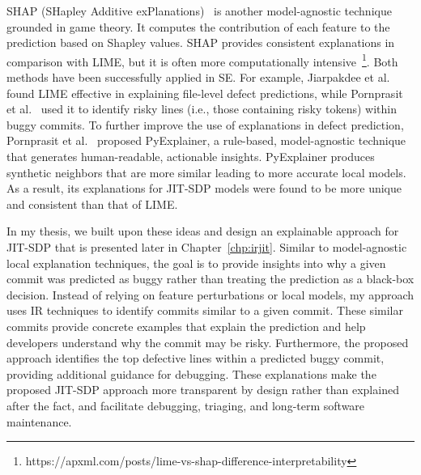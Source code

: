 \documentclass[\main/thesis.tex]{subfiles}
\begin{document}
SHAP (SHapley Additive exPlanations)~\cite{lundberg2017unified} is another model-agnostic technique grounded in game theory. It computes the contribution of each feature to the prediction based on Shapley values. SHAP provides consistent explanations in comparison with LIME, but it is often more computationally intensive~\footnote{https://apxml.com/posts/lime-vs-shap-difference-interpretability}.
Both methods have been successfully applied in SE. For example, Jiarpakdee et al.~\cite{jiarpakdee2021practitioners} found LIME effective in explaining file-level defect predictions, while Pornprasit et al.~\cite{pornprasit2021jitline} used it to identify risky lines (i.e., those containing risky tokens) within buggy commits. To further improve the use of explanations in defect prediction, Pornprasit et al.~\cite{pornprasit2021pyexplainer} proposed PyExplainer, a rule-based, model-agnostic technique that generates human-readable, actionable insights. PyExplainer produces synthetic neighbors that are more similar leading to more accurate local models. As a result, its explanations for JIT-SDP models were found to be more unique and consistent than that of LIME.

In my thesis, we built upon these ideas and design an explainable approach for JIT-SDP that is presented later in Chapter~\ref{chp:irjit}. Similar to model-agnostic local explanation techniques, the goal is to provide insights into why a given commit was predicted as buggy rather than treating the prediction as a black-box decision. Instead of relying on feature perturbations or local models, my approach uses IR techniques to identify commits similar to a given commit. These similar commits provide concrete examples that explain the prediction and help developers understand why the commit may be risky. Furthermore, the proposed approach identifies the top defective lines within a predicted buggy commit, providing additional guidance for debugging. These explanations make the proposed JIT-SDP approach more transparent by design rather than explained after the fact, and facilitate debugging, triaging, and long-term software maintenance.

\end{document}

